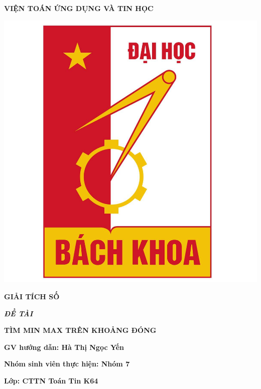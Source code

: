 \documentclass[a4paper]{article}
\begin{document}
\begin{titlepage}
\begin{center}
    \vspace{7pt}
    \textbf{VIỆN TOÁN ỨNG DỤNG VÀ TIN HỌC}
\end{center}
\vspace{10pt}
\begin{center}
    \includegraphics[scale=0.2]{hust.png}
    
    \vspace{10pt}
    \fontsize{18pt}{17pt}\selectfont 
    
    \vspace{7pt}
    \textbf{GIẢI TÍCH SỐ}
\end{center}
\begin{flushleft}
    \fontsize{14pt}{17pt}\selectfont  
    \textbf{\textsl{ĐỀ TÀI}}
\end{flushleft}
\begin{center}
    \fontsize{18pt}{17pt}\selectfont 
    \textbf{\textrm{TÌM MIN MAX TRÊN KHOẢNG ĐÓNG}}
\end{center}

\vspace{15pt}
\textbf{GV hướng dẫn: Hà Thị Ngọc Yến}

\vspace{10pt}
\textbf{Nhóm sinh viên thực hiện: Nhóm 7}

\vspace{10pt}
\textbf{Lớp: CTTN Toán Tin K64}


\end{titlepage}
\end{document}
